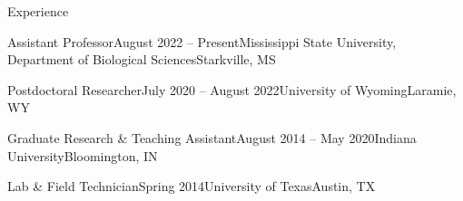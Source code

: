 \documentclass{resume} %
\begin{document}
\begin{rSection}{Experience}

\begin{rSubsection}{Assistant Professor}{August 2022 -- Present}{Mississippi State University, Department of Biological Sciences}{Starkville, MS}
\end{rSubsection}

\begin{rSubsection}{Postdoctoral Researcher}{July 2020 -- August 2022}{University of Wyoming}{Laramie, WY}

\end{rSubsection}

\begin{rSubsection}{Graduate Research \& Teaching Assistant}{August 2014 -- May 2020}{Indiana University}{Bloomington, IN}
\end{rSubsection}

\begin{rSubsection}{Lab \& Field Technician}{Spring 2014}{University of Texas}{Austin, TX}
\end{rSubsection}

\end{rSection}
\bigskip
\end{document}
